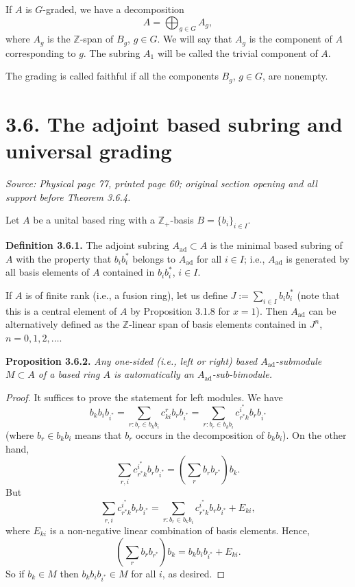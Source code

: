 \documentclass[11pt]{article}
\newcommand{\Z}{\mathbb{Z}}
\newcommand{\Zp}{\mathbb{Z}_+}
\newcommand{\Aad}{A_{\mathrm{ad}}}
\newcommand{\sourceloc}[1]{\par\smallskip\noindent\textit{Source: #1.}\par\nopagebreak[4]\smallskip}
\begin{document}
If $A$ is $G$-graded, we have a decomposition
\[
A=\bigoplus_{g\in G}A_g,
\]
where $A_g$ is the $\Z$-span of $B_g$, $g\in G$. We will say that $A_g$ is
the component of $A$ corresponding to $g$. The subring $A_1$ will be
called the trivial component of $A$.

The grading is called faithful if all the components $B_g$, $g\in G$,
are nonempty.

\section*{3.6. The adjoint based subring and universal grading}
\sourceloc{Physical page 77, printed page 60; original section opening and all support before Theorem 3.6.4}
Let $A$ be a unital based ring with a $\Zp$-basis $B=\{b_i\}_{i\in I}$.

\noindent\textbf{Definition 3.6.1.}
The adjoint subring $\Aad\subset A$ is the minimal based subring of $A$
with the property that $b_i b_i^*$ belongs to $\Aad$ for all $i\in I$;
i.e., $\Aad$ is generated by all basis elements of $A$ contained in
$b_i b_i^*$, $i\in I$.

If $A$ is of finite rank (i.e., a fusion ring), let us define
$J:=\sum_{i\in I}b_i b_i^*$ (note that this is a central element of $A$
by Proposition 3.1.8 for $x=1$). Then $\Aad$ can be alternatively defined
as the $\Z$-linear span of basis elements contained in $J^n$,
$n=0,1,2,\ldots$.

\noindent\textbf{Proposition 3.6.2.}
\emph{Any one-sided (i.e., left or right) based $\Aad$-submodule
$M\subset A$ of a based ring $A$ is automatically an $\Aad$-sub-bimodule.}
\begin{proof}
It suffices to prove the statement for left modules. We have
\[
b_k b_i b_{i^*}
 =\sum_{r:b_r\in b_k b_i}c^r_{ki}b_r b_{i^*}
 =\sum_{r:b_r\in b_k b_i}c^{i^*}_{r^*k}b_r b_{i^*}
\]
(where $b_r\in b_k b_i$ means that $b_r$ occurs in the decomposition of
$b_k b_i$). On the other hand,
\[
\sum_{r,i}c^{i^*}_{r^*k}b_r b_{i^*}
 =\left(\sum_r b_r b_{r^*}\right)b_k.
\]
But
\[
\sum_{r,i}c^{i^*}_{r^*k}b_r b_{i^*}
 =\sum_{r:b_r\in b_k b_i}c^{i^*}_{r^*k}b_r b_{i^*}+E_{ki},
\]
where $E_{ki}$ is a non-negative linear combination of basis elements.
Hence,
\[
\left(\sum_r b_r b_{r^*}\right)b_k=b_k b_i b_{i^*}+E_{ki}.
\]
So if $b_k\in M$ then $b_k b_i b_{i^*}\in M$ for all $i$, as desired.
\end{proof}
\end{document}
